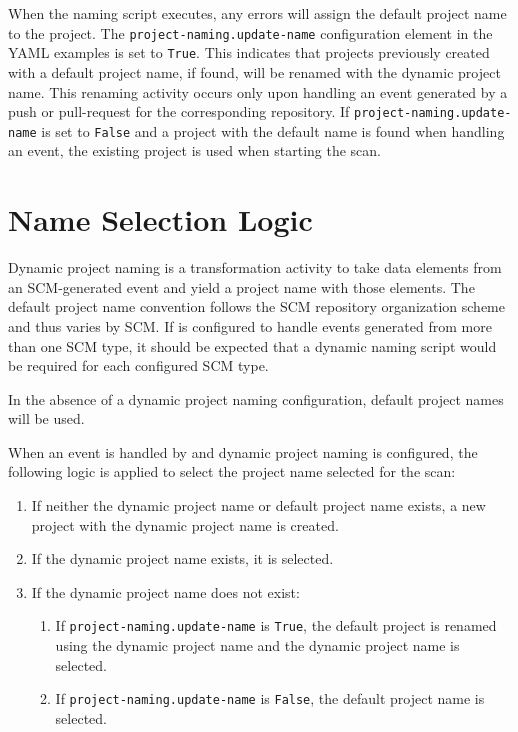 When the naming script executes, any errors will assign the default project name to the project.  
The \texttt{project-naming.update-name} configuration element in the YAML examples is set to \texttt{True}.  This indicates that
projects previously created with a default project name, if found, will be renamed with the dynamic project name.  This
renaming activity occurs only upon handling an event generated by a push or pull-request for the corresponding
repository.  If \texttt{project-naming.update-name} is set to \texttt{False} and a project with the default name
is found when handling an event, the existing project is used when starting the scan.


\section{Name Selection Logic}

Dynamic project naming is a transformation activity to take data elements from an SCM-generated event and yield
a project name with those elements.  The default project name convention follows the SCM repository organization
scheme and thus varies by SCM.  If \cxoneflow is configured to handle events generated from more than one SCM type,
it should be expected that a dynamic naming script would be required for each configured SCM type.

In the absence of a dynamic project naming configuration, default project names will be used.

When an event is handled by \cxoneflow and dynamic project naming is configured, the following logic is applied
to select the project name selected for the scan:

\begin{enumerate}
  \item If neither the dynamic project name or default project name exists, a new project with the dynamic project name is created.
  \item If the dynamic project name exists, it is selected.
  \item If the dynamic project name does not exist:
  \begin{enumerate}
    \item If \texttt{project-naming.update-name} is \texttt{True}, the default project is renamed using the dynamic project name
    and the dynamic project name is selected.
    \item If \texttt{project-naming.update-name} is \texttt{False}, the default project name is selected.
  \end{enumerate}
\end{enumerate}

